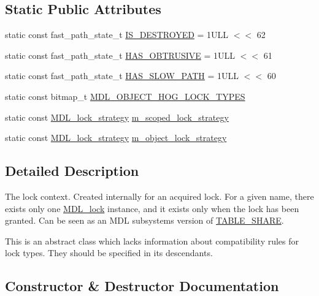 \subsection*{Static Public Attributes}
\begin{DoxyCompactItemize}
\item 
static const fast\+\_\+path\+\_\+state\+\_\+t \mbox{\hyperlink{classMDL__lock_a1627af1fd21d2ae76c27b39901e574a3}{I\+S\+\_\+\+D\+E\+S\+T\+R\+O\+Y\+ED}} = 1\+U\+L\+L $<$$<$ 62
\item 
static const fast\+\_\+path\+\_\+state\+\_\+t \mbox{\hyperlink{classMDL__lock_ac0e55394e253bd9d0988c9a7ab243a39}{H\+A\+S\+\_\+\+O\+B\+T\+R\+U\+S\+I\+VE}} = 1\+U\+L\+L $<$$<$ 61
\item 
static const fast\+\_\+path\+\_\+state\+\_\+t \mbox{\hyperlink{classMDL__lock_ace80291dc2f7786288cdf1cec54bcb55}{H\+A\+S\+\_\+\+S\+L\+O\+W\+\_\+\+P\+A\+TH}} = 1\+U\+L\+L $<$$<$ 60
\item 
static const bitmap\+\_\+t \mbox{\hyperlink{classMDL__lock_abaeb101565637f92f74d4a84bdc53fa5}{M\+D\+L\+\_\+\+O\+B\+J\+E\+C\+T\+\_\+\+H\+O\+G\+\_\+\+L\+O\+C\+K\+\_\+\+T\+Y\+P\+ES}}
\item 
static const \mbox{\hyperlink{structMDL__lock_1_1MDL__lock__strategy}{M\+D\+L\+\_\+lock\+\_\+strategy}} \mbox{\hyperlink{classMDL__lock_aed7a092b4b9aa426597f599feb6bb19b}{m\+\_\+scoped\+\_\+lock\+\_\+strategy}}
\item 
static const \mbox{\hyperlink{structMDL__lock_1_1MDL__lock__strategy}{M\+D\+L\+\_\+lock\+\_\+strategy}} \mbox{\hyperlink{classMDL__lock_a6ed94b58baea6bf2e22b76566aa513b3}{m\+\_\+object\+\_\+lock\+\_\+strategy}}
\end{DoxyCompactItemize}


\subsection{Detailed Description}
The lock context. Created internally for an acquired lock. For a given name, there exists only one \mbox{\hyperlink{classMDL__lock}{M\+D\+L\+\_\+lock}} instance, and it exists only when the lock has been granted. Can be seen as an M\+DL subsystem\textquotesingle{}s version of \mbox{\hyperlink{structTABLE__SHARE}{T\+A\+B\+L\+E\+\_\+\+S\+H\+A\+RE}}.

This is an abstract class which lacks information about compatibility rules for lock types. They should be specified in its descendants. 

\subsection{Constructor \& Destructor Documentation}
\mbox{\label{classMDL__lock_aeb9c4ffed74256bb57fca7619d141bf4}} 
